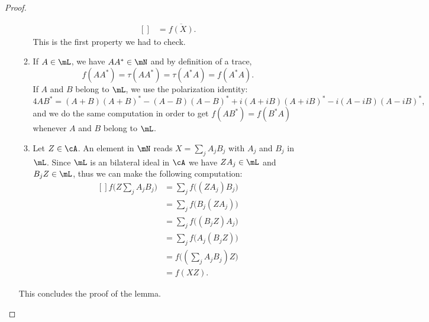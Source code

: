 \begin{proof}
\begin{enumerate}
\begin{enumerate}
\begin{equation}
\begin{aligned}[]
					                   & =\overline{ f(X) }.
				            \end{aligned}
			            \end{equation}
			            This is the first property we had to check.
			      \item
			            If $A\in\mL$, we have $AA^*\in\mN$ and by definition of a trace,
			            \begin{equation}
				            f(AA^*)=\tau(AA^*)=\tau(A^*A)=f(A^*A).
			            \end{equation}
			            If $A$ and $B$ belong to $\mL$, we use the polarization identity:
			            \begin{equation}
				            4AB^*=(A+B)(A+B)^*-(A-B)(A-B)^*+i(A+iB)(A+iB)^*-i(A-iB)(A-iB)^*,
			            \end{equation}
			            and we do the same computation in order to get $f(AB^*)=f(B^*A)$ whenever $A$ and $B$ belong to $\mL$.
			      \item
			            Let $Z\in\cA$. An element in $\mN$ reads $X=\sum_jA_jB_j$ with $A_j$ and $B_j$ in $\mL$. Since $\mL$ is an bilateral ideal in $\cA$ we have $ZA_j\in\mL$ and $B_jZ\in\mL$, thus we can make the following computation:
			            \begin{equation}
				            \begin{aligned}[]
					            f\big( Z\sum_jA_jB_j \big) & =\sum_jf\big( (ZA_j)B_j \big) \\
					                                       & =\sum_jf\big( B_j(ZA_j) \big) \\
					                                       & =\sum_jf\big( (B_jZ)A_j \big) \\
					                                       & =\sum_jf\big( A_j(B_jZ) \big) \\
					                                       & =f\big( (\sum_jA_jB_j)Z \big) \\
					                                       & =f(XZ).
				            \end{aligned}
			            \end{equation}
		      \end{enumerate}
		      This concludes the proof of the lemma.
	\end{enumerate}


\end{proof}
